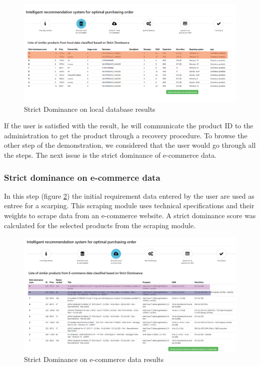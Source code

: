 \documentclass[preprint,3p,onecolumn]{elsarticle}
\begin{document}
\begin{figure}[H]
\centering
\includegraphics[scale=.3]{02_LocalDatabase}
\caption{Strict Dominance on local database results}
\label{02_LocalDatabase}
\end{figure}

\par If the user is satisfied with the result, he will communicate the product ID to the administration to get the product through a recovery procedure. To browse the other step of the demonstration, we considered that the user would go through all the steps. The next issue is the strict dominance of e-commerce data.

\subsubsection{Strict dominance on e-commerce data}
\par In this step (figure \ref{03_Ecommerce}) the initial requirement data entered by the user are used as entree for a scarping. This scraping module uses technical specifications and their weights to scrape data from an e-commerce website. A strict dominance score was calculated for the selected products from the scraping module.

\begin{figure}[H]
\centering
\includegraphics[scale=.3]{03_Ecommerce}
\caption{Strict Dominance on e-commerce data results}
\label{03_Ecommerce}
\end{figure}
\end{document}
